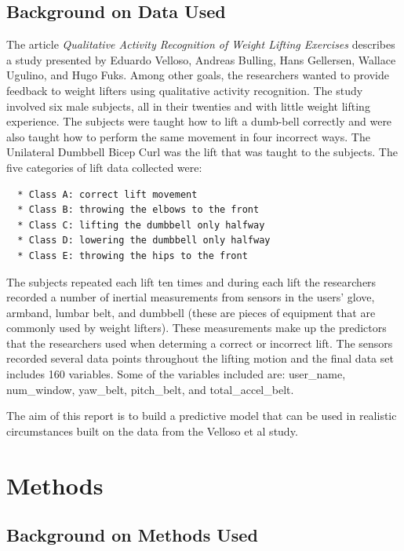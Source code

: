 \documentclass[12pt,twoside]{reedthesis}
\begin{document}
  \section{Background on Data Used}\label{background-on-data-used}
  
  The article \emph{Qualitative Activity Recognition of Weight Lifting
  Exercises} describes a study presented by Eduardo Velloso, Andreas
  Bulling, Hans Gellersen, Wallace Ugulino, and Hugo Fuks. Among other
  goals, the researchers wanted to provide feedback to weight lifters
  using qualitative activity recognition. The study involved six male
  subjects, all in their twenties and with little weight lifting
  experience. The subjects were taught how to lift a dumb-bell correctly
  and were also taught how to perform the same movement in four incorrect
  ways. The Unilateral Dumbbell Bicep Curl was the lift that was taught to
  the subjects. The five categories of lift data collected were:
  
  \begin{verbatim}
  * Class A: correct lift movement
  * Class B: throwing the elbows to the front
  * Class C: lifting the dumbbell only halfway
  * Class D: lowering the dumbbell only halfway
  * Class E: throwing the hips to the front
  \end{verbatim}
  
  The subjects repeated each lift ten times and during each lift the
  researchers recorded a number of inertial measurements from sensors in
  the users' glove, armband, lumbar belt, and dumbbell (these are pieces
  of equipment that are commonly used by weight lifters). These
  measurements make up the predictors that the researchers used when
  determing a correct or incorrect lift. The sensors recorded several data
  points throughout the lifting motion and the final data set includes 160
  variables. Some of the variables included are: user\_name, num\_window,
  yaw\_belt, pitch\_belt, and total\_accel\_belt.
  
  The aim of this report is to build a predictive model that can be used
  in realistic circumstances built on the data from the Velloso et al
  study.
  
  \chapter{Methods}\label{rmd-basics}
  
  \section{Background on Methods Used}\label{background-on-methods-used}
  
\end{document}
